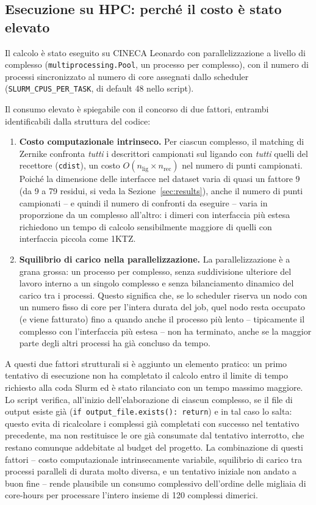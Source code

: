 \documentclass[11pt,a4paper]{article}
\begin{document}
\subsection{Esecuzione su HPC: perché il costo è stato elevato}
\label{sec:task2-hpc-cost}
Il calcolo è stato eseguito su CINECA Leonardo con parallelizzazione a livello di complesso (\texttt{multiprocessing.Pool}, un processo per complesso), con il numero di processi sincronizzato al numero di core assegnati dallo scheduler (\texttt{SLURM\_CPUS\_PER\_TASK}, di default 48 nello script).
 
Il consumo elevato è spiegabile con il concorso di due fattori, entrambi identificabili dalla struttura del codice:
 
\begin{enumerate}
    \item \textbf{Costo computazionale intrinseco.} Per ciascun complesso, il matching di Zernike confronta \emph{tutti} i descrittori campionati sul ligando con \emph{tutti} quelli del recettore (\texttt{cdist}), un costo $O(n_{\text{lig}} \times n_{\text{rec}})$ nel numero di punti campionati. Poiché la dimensione delle interfacce nel dataset varia di quasi un fattore 9 (da 9 a 79 residui, si veda la Sezione~\ref{sec:results}), anche il numero di punti campionati -- e quindi il numero di confronti da eseguire -- varia in proporzione da un complesso all'altro: i dimeri con interfaccia più estesa richiedono un tempo di calcolo sensibilmente maggiore di quelli con interfaccia piccola come 1KTZ.
    \item \textbf{Squilibrio di carico nella parallelizzazione.} La parallelizzazione è a grana grossa: un processo per complesso, senza suddivisione ulteriore del lavoro interno a un singolo complesso e senza bilanciamento dinamico del carico tra i processi. Questo significa che, se lo scheduler riserva un nodo con un numero fisso di core per l'intera durata del job, quel nodo resta occupato (e viene fatturato) fino a quando anche il processo più lento -- tipicamente il complesso con l'interfaccia più estesa -- non ha terminato, anche se la maggior parte degli altri processi ha già concluso da tempo.
\end{enumerate}
 
A questi due fattori strutturali si è aggiunto un elemento pratico: un primo tentativo di esecuzione non ha completato il calcolo entro il limite di tempo richiesto alla coda Slurm ed è stato rilanciato con un tempo massimo maggiore. Lo script verifica, all'inizio dell'elaborazione di ciascun complesso, se il file di output esiste già (\texttt{if output\_file.exists(): return}) e in tal caso lo salta: questo evita di ricalcolare i complessi già completati con successo nel tentativo precedente, ma non restituisce le ore già consumate dal tentativo interrotto, che restano comunque addebitate al budget del progetto. La combinazione di questi fattori -- costo computazionale intrinsecamente variabile, squilibrio di carico tra processi paralleli di durata molto diversa, e un tentativo iniziale non andato a buon fine -- rende plausibile un consumo complessivo dell'ordine delle migliaia di core-hours per processare l'intero insieme di 120 complessi dimerici.
 
\end{document}
